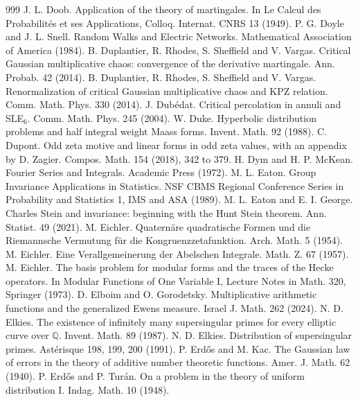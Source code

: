 \begin{thebibliography}{999}
 J. L. Doob. Application of the theory of martingales. In Le Calcul des Probabilit\'es et ses Applications, Colloq. Internat. CNRS 13 (1949).
 P. G. Doyle and J. L. Snell. Random Walks and Electric Networks. Mathematical Association of America (1984).
 B. Duplantier, R. Rhodes, S. Sheffield and V. Vargas. Critical Gaussian multiplicative chaos: convergence of the derivative martingale. Ann. Probab. 42 (2014).
 B. Duplantier, R. Rhodes, S. Sheffield and V. Vargas. Renormalization of critical Gaussian multiplicative chaos and KPZ relation. Comm. Math. Phys. 330 (2014).
 J. Dub\'edat. Critical percolation in annuli and SLE$_6$. Comm. Math. Phys. 245 (2004).
 W. Duke. Hyperbolic distribution problems and half integral weight Maass forms. Invent. Math. 92 (1988).
 C. Dupont. Odd zeta motive and linear forms in odd zeta values, with an appendix by D. Zagier. Compos. Math. 154 (2018), 342 to 379.
 H. Dym and H. P. McKean. Fourier Series and Integrals. Academic Press (1972).
 M. L. Eaton. Group Invariance Applications in Statistics. NSF CBMS Regional Conference Series in Probability and Statistics 1, IMS and ASA (1989).
 M. L. Eaton and E. I. George. Charles Stein and invariance: beginning with the Hunt Stein theorem. Ann. Statist. 49 (2021).
 M. Eichler. Quatern\"are quadratische Formen und die Riemannsche Vermutung f\"ur die Kongruenzzetafunktion. Arch. Math. 5 (1954).
 M. Eichler. Eine Verallgemeinerung der Abelschen Integrale. Math. Z. 67 (1957).
 M. Eichler. The basis problem for modular forms and the traces of the Hecke operators. In Modular Functions of One Variable I, Lecture Notes in Math. 320, Springer (1973).
 D. Elboim and O. Gorodetsky. Multiplicative arithmetic functions and the generalized Ewens measure. Israel J. Math. 262 (2024).
 N. D. Elkies. The existence of infinitely many supersingular primes for every elliptic curve over $\mathbb{Q}$. Invent. Math. 89 (1987).
 N. D. Elkies. Distribution of supersingular primes. Ast\'erisque 198, 199, 200 (1991).
 P. Erd\H{o}s and M. Kac. The Gaussian law of errors in the theory of additive number theoretic functions. Amer. J. Math. 62 (1940).
 P. Erd\H{o}s and P. Tur\'an. On a problem in the theory of uniform distribution I. Indag. Math. 10 (1948).

\end{thebibliography}
